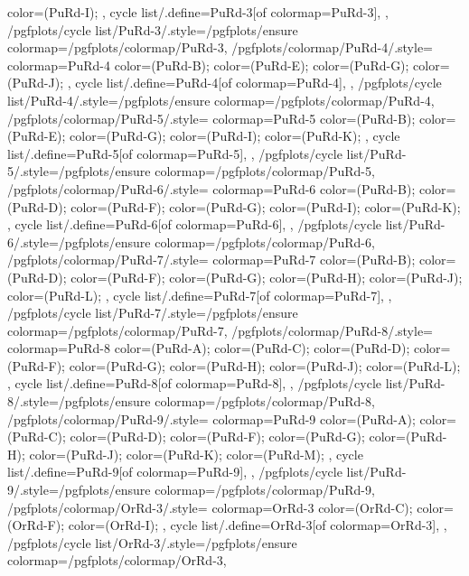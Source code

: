 {{{      color=(PuRd-I);
    },
    cycle list/.define={PuRd-3}{[of colormap=PuRd-3]},
  },
  /pgfplots/cycle list/PuRd-3/.style={/pgfplots/ensure colormap={/pgfplots/colormap/PuRd-3}},
  /pgfplots/colormap/PuRd-4/.style={
    colormap={PuRd-4}{
      color=(PuRd-B);
      color=(PuRd-E);
      color=(PuRd-G);
      color=(PuRd-J);
    },
    cycle list/.define={PuRd-4}{[of colormap=PuRd-4]},
  },
  /pgfplots/cycle list/PuRd-4/.style={/pgfplots/ensure colormap={/pgfplots/colormap/PuRd-4}},
  /pgfplots/colormap/PuRd-5/.style={
    colormap={PuRd-5}{
      color=(PuRd-B);
      color=(PuRd-E);
      color=(PuRd-G);
      color=(PuRd-I);
      color=(PuRd-K);
    },
    cycle list/.define={PuRd-5}{[of colormap=PuRd-5]},
  },
  /pgfplots/cycle list/PuRd-5/.style={/pgfplots/ensure colormap={/pgfplots/colormap/PuRd-5}},
  /pgfplots/colormap/PuRd-6/.style={
    colormap={PuRd-6}{
      color=(PuRd-B);
      color=(PuRd-D);
      color=(PuRd-F);
      color=(PuRd-G);
      color=(PuRd-I);
      color=(PuRd-K);
    },
    cycle list/.define={PuRd-6}{[of colormap=PuRd-6]},
  },
  /pgfplots/cycle list/PuRd-6/.style={/pgfplots/ensure colormap={/pgfplots/colormap/PuRd-6}},
  /pgfplots/colormap/PuRd-7/.style={
    colormap={PuRd-7}{
      color=(PuRd-B);
      color=(PuRd-D);
      color=(PuRd-F);
      color=(PuRd-G);
      color=(PuRd-H);
      color=(PuRd-J);
      color=(PuRd-L);
    },
    cycle list/.define={PuRd-7}{[of colormap=PuRd-7]},
  },
  /pgfplots/cycle list/PuRd-7/.style={/pgfplots/ensure colormap={/pgfplots/colormap/PuRd-7}},
  /pgfplots/colormap/PuRd-8/.style={
    colormap={PuRd-8}{
      color=(PuRd-A);
      color=(PuRd-C);
      color=(PuRd-D);
      color=(PuRd-F);
      color=(PuRd-G);
      color=(PuRd-H);
      color=(PuRd-J);
      color=(PuRd-L);
    },
    cycle list/.define={PuRd-8}{[of colormap=PuRd-8]},
  },
  /pgfplots/cycle list/PuRd-8/.style={/pgfplots/ensure colormap={/pgfplots/colormap/PuRd-8}},
  /pgfplots/colormap/PuRd-9/.style={
    colormap={PuRd-9}{
      color=(PuRd-A);
      color=(PuRd-C);
      color=(PuRd-D);
      color=(PuRd-F);
      color=(PuRd-G);
      color=(PuRd-H);
      color=(PuRd-J);
      color=(PuRd-K);
      color=(PuRd-M);
    },
    cycle list/.define={PuRd-9}{[of colormap=PuRd-9]},
  },
  /pgfplots/cycle list/PuRd-9/.style={/pgfplots/ensure colormap={/pgfplots/colormap/PuRd-9}},
  /pgfplots/colormap/OrRd-3/.style={
    colormap={OrRd-3}{
      color=(OrRd-C);
      color=(OrRd-F);
      color=(OrRd-I);
    },
    cycle list/.define={OrRd-3}{[of colormap=OrRd-3]},
  },
  /pgfplots/cycle list/OrRd-3/.style={/pgfplots/ensure colormap={/pgfplots/colormap/OrRd-3}},
}
